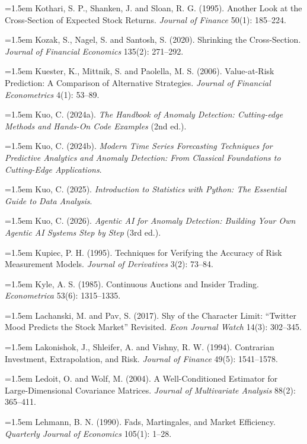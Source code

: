 \hangindent=1.5em Kothari, S. P., Shanken, J. and Sloan, R. G. (1995). Another Look at the Cross-Section of Expected Stock Returns. \emph{Journal of Finance} 50(1): 185--224.

\hangindent=1.5em Kozak, S., Nagel, S. and Santosh, S. (2020). Shrinking the Cross-Section. \emph{Journal of Financial Economics} 135(2): 271--292.

\hangindent=1.5em Kuester, K., Mittnik, S. and Paolella, M. S. (2006). Value-at-Risk Prediction: A Comparison of Alternative Strategies. \emph{Journal of Financial Econometrics} 4(1): 53--89.

\hangindent=1.5em Kuo, C. (2024a). \emph{The Handbook of Anomaly Detection: Cutting-edge Methods and Hands-On Code Examples} (2nd ed.).

\hangindent=1.5em Kuo, C. (2024b). \emph{Modern Time Series Forecasting Techniques for Predictive Analytics and Anomaly Detection: From Classical Foundations to Cutting-Edge Applications}.

\hangindent=1.5em Kuo, C. (2025). \emph{Introduction to Statistics with Python: The Essential Guide to Data Analysis}.

\hangindent=1.5em Kuo, C. (2026). \emph{Agentic AI for Anomaly Detection: Building Your Own Agentic AI Systems Step by Step} (3rd ed.).

\hangindent=1.5em Kupiec, P. H. (1995). Techniques for Verifying the Accuracy of Risk Measurement Models. \emph{Journal of Derivatives} 3(2): 73--84.

\hangindent=1.5em Kyle, A. S. (1985). Continuous Auctions and Insider Trading. \emph{Econometrica} 53(6): 1315--1335.

\hangindent=1.5em Lachanski, M. and Pav, S. (2017). Shy of the Character Limit: ``Twitter Mood Predicts the Stock Market'' Revisited. \emph{Econ Journal Watch} 14(3): 302--345.

\hangindent=1.5em Lakonishok, J., Shleifer, A. and Vishny, R. W. (1994). Contrarian Investment, Extrapolation, and Risk. \emph{Journal of Finance} 49(5): 1541--1578.

\hangindent=1.5em Ledoit, O. and Wolf, M. (2004). A Well-Conditioned Estimator for Large-Dimensional Covariance Matrices. \emph{Journal of Multivariate Analysis} 88(2): 365--411.

\hangindent=1.5em Lehmann, B. N. (1990). Fads, Martingales, and Market Efficiency. \emph{Quarterly Journal of Economics} 105(1): 1--28.

